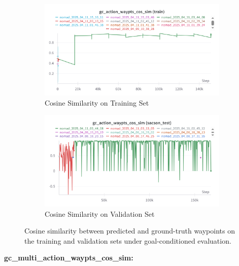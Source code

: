 \documentclass[12pt]{article}
\begin{document}
\begin{figure}[H]
    \centering
    \begin{subfigure}[b]{0.48\textwidth}
        \centering
        \includegraphics[width=\textwidth]{images/gc_action_waypts_cos_sim_train.png}
        \caption{Cosine Similarity on Training Set}
        \label{fig:gc_action_waypts_cos_sim_train}
    \end{subfigure}
    \hfill
    \begin{subfigure}[b]{0.48\textwidth}
        \centering
        \includegraphics[width=\textwidth]{images/gc_action_waypts_cos_sim_test.png}
        \caption{Cosine Similarity on Validation Set}
        \label{fig:gc_action_waypts_cos_sim_val}
    \end{subfigure}
    \caption{Cosine similarity between predicted and ground-truth waypoints on the training and validation sets under goal-conditioned evaluation.}
\end{figure}
\newpage
\noindent \textbf{gc\_multi\_action\_waypts\_cos\_sim:}\\
\end{document}
